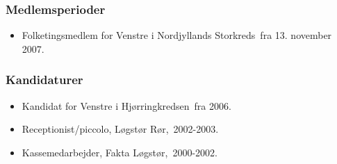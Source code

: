 \documentclass[11pt, a4paper]{awesome-cv}
\begin{document}
\begin{cvletter}
\subsubsection*{Medlemsperioder}
\begin{itemize}
\item Folketingsmedlem for Venstre i Nordjyllands Storkreds fra 13. november 2007.
\end{itemize}
\subsubsection*{Kandidaturer}
\begin{itemize}
\item Kandidat for Venstre i Hjørringkredsen fra 2006.
\end{itemize}
\begin{itemize}
\item Receptionist/piccolo, Løgstør Rør, 2002-2003.
\item Kassemedarbejder, Fakta Løgstør, 2000-2002.
\end{itemize}
\end{cvletter}
\end{document}

